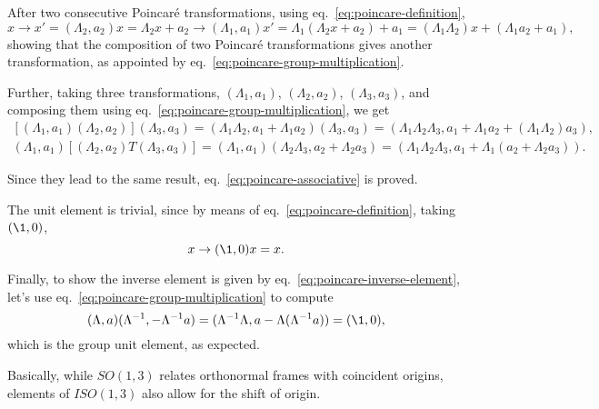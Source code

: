 \begin{mdframed}
\begin{innerproof}
    After two consecutive Poincaré transformations, using eq.~\eqref{eq:poincare-definition},
    \begin{equation*}
        x \to x' = (\Lambda_2,a_2)x = \Lambda_2 x + a_2 \to (\Lambda_1,a_1) x' = \Lambda_1 (\Lambda_2 x + a_2) + a_1 = (\Lambda_1 \Lambda_2) x + (\Lambda_1 a_2 + a_1) ,
    \end{equation*}
    showing that the composition of two Poincaré transformations gives another transformation, as appointed by eq.~\eqref{eq:poincare-group-multiplication}.

    Further, taking three transformations, $(\Lambda_1,a_1)$, $(\Lambda_2,a_2)$, $(\Lambda_3,a_3)$, and composing them using eq.~\eqref{eq:poincare-group-multiplication}, we get
    \begin{gather*}
        \left[ (\Lambda_1,a_1)(\Lambda_2,a_2) \right] (\Lambda_3,a_3) = (\Lambda_1\Lambda_2, a_1 + \Lambda_1 a_2) (\Lambda_3,a_3) = (\Lambda_1\Lambda_2\Lambda_3, a_1 + \Lambda_1 a_2 + (\Lambda_1 \Lambda_2)a_3) , \\
        (\Lambda_1,a_1)\left[(\Lambda_2,a_2)T(\Lambda_3,a_3)\right] = (\Lambda_1,a_1) (\Lambda_2\Lambda_3, a_2 + \Lambda_2 a_3) = (\Lambda_1\Lambda_2\Lambda_3, a_1+\Lambda_1(a_2 + \Lambda_2 a_3)) .
    \end{gather*}
 
    Since they lead to the same result, eq.~\eqref{eq:poincare-associative} is proved.

    The unit element is trivial, since by means of eq.~\eqref{eq:poincare-definition}, taking $(\1,0)$,
    \begin{equation*}
        x \to (\1,0) x = x.
    \end{equation*}

    Finally, to show the inverse element is given by eq.~\eqref{eq:poincare-inverse-element}, let's use eq.~\eqref{eq:poincare-group-multiplication} to compute
    \begin{equation*}
       (\Lambda,a) (\Lambda^{-1}, -\Lambda^{-1}a) = (\Lambda^{-1}\Lambda, a - \Lambda(\Lambda^{-1}a)) = (\1,0),
    \end{equation*}
    which is the group unit element, as expected.
\end{innerproof}
\end{mdframed}

Basically, while $SO(1,3)$ relates orthonormal frames with coincident origins, elements of $ISO(1,3)$ also allow for the shift of origin.



